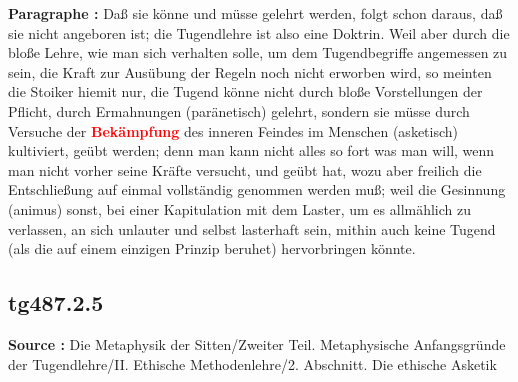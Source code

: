 \documentclass[a4paper,12pt,twoside]{book}
\newcommand{\match}[1]{\textcolor{red}{\textbf{#1}}}
\begin{document}
	\textbf{Paragraphe : }Daß sie könne und müsse gelehrt werden, folgt schon daraus, daß sie nicht angeboren ist; die Tugendlehre ist also eine Doktrin. Weil aber durch die bloße Lehre, wie man sich verhalten solle, um dem Tugendbegriffe angemessen zu sein, die Kraft zur Ausübung der Regeln noch nicht erworben wird, so meinten die Stoiker hiemit nur, die Tugend könne nicht durch bloße Vorstellungen der Pflicht, durch Ermahnungen (paränetisch) gelehrt, sondern sie müsse durch Versuche der \match{Bekämpfung} des inneren Feindes im Menschen (asketisch) kultiviert, geübt werden; denn man kann nicht alles so fort was man will, wenn man nicht vorher seine Kräfte versucht, und geübt hat, wozu aber freilich die Entschließung auf einmal vollständig genommen werden muß; weil die Gesinnung (animus) sonst, bei einer Kapitulation mit dem Laster, um es allmählich zu verlassen, an sich unlauter und selbst lasterhaft sein, mithin auch keine Tugend (als die auf einem einzigen Prinzip beruhet) hervorbringen könnte. 
	
	\subsection*{tg487.2.5} 
	\textbf{Source : }Die Metaphysik der Sitten/Zweiter Teil. Metaphysische Anfangsgründe der Tugendlehre/II. Ethische Methodenlehre/2. Abschnitt. Die ethische Asketik\\  
	
\end{document}
